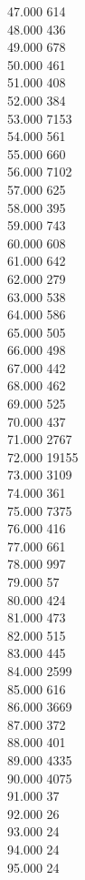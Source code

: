 { 47.000	614 \\
 48.000	436 \\
 49.000	678 \\
 50.000	461 \\
 51.000	408 \\
 52.000	384 \\
 53.000	7153 \\
 54.000	561 \\
 55.000	660 \\
 56.000	7102 \\
 57.000	625 \\
 58.000	395 \\
 59.000	743 \\
 60.000	608 \\
 61.000	642 \\
 62.000	279 \\
 63.000	538 \\
 64.000	586 \\
 65.000	505 \\
 66.000	498 \\
 67.000	442 \\
 68.000	462 \\
 69.000	525 \\
 70.000	437 \\
 71.000	2767 \\
 72.000	19155 \\
 73.000	3109 \\
 74.000	361 \\
 75.000	7375 \\
 76.000	416 \\
 77.000	661 \\
 78.000	997 \\
 79.000	57 \\
 80.000	424 \\
 81.000	473 \\
 82.000	515 \\
 83.000	445 \\
 84.000	2599 \\
 85.000	616 \\
 86.000	3669 \\
 87.000	372 \\
 88.000	401 \\
 89.000	4335 \\
 90.000	4075 \\
 91.000	37 \\
 92.000	26 \\
 93.000	24 \\
 94.000	24 \\
 95.000	24 \\
}
